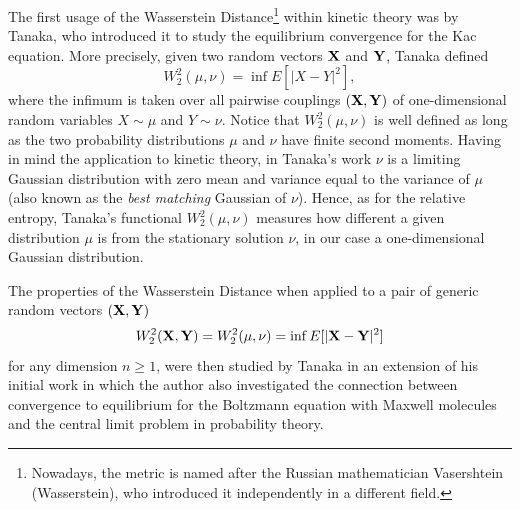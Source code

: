 \documentclass{article}
\renewcommand{\ge}{\geqslant}
\def\bX{{\bf X}}
\def\bY{{\bf Y}}
\begin{document}
% 
The first usage of the Wasserstein Distance\footnote{Nowadays, the metric is named after the Russian mathematician Vasershtein (Wasserstein), who introduced it independently in a different field.\cite{Wass}} within kinetic theory was by Tanaka, who introduced it to study the equilibrium convergence for the Kac equation.\cite{Tan1}
% 
More precisely, given two random vectors $\bX$ and $\bY$, Tanaka defined 
\[
    W^2_2(\mu,\nu) = \inf E[|X-Y|^2],
\]
where the infimum is taken over all pairwise couplings $(\bX,\bY)$ of one-dimensional random variables $X\sim \mu$ and $Y\sim\nu$.
% 
Notice that $W^2_2(\mu,\nu)$ is well defined as long as the two probability distributions $\mu$ and $\nu$ have finite second moments.
% 
Having in mind the application to kinetic theory, in Tanaka's work $\nu$ is a limiting Gaussian distribution with zero mean and variance equal to the variance of $\mu$ (also known as the \emph{best matching} Gaussian of $\nu$).
% 
Hence, as for the relative entropy, Tanaka's functional  $W^2_2(\mu,\nu)$ measures how different a given distribution $\mu$ is from the stationary solution $\nu$, in our case a one-dimensional Gaussian distribution.
% 


The properties of the Wasserstein Distance when applied to a pair of generic random vectors $(\bX,\bY)$
% 
\begin{equation}
    \label{Wasser}
    W^2_2(\bX,\bY) = W^2_2(\mu,\nu) = \inf E[|\bX-\bY|^2]
\end{equation}
% 
for any dimension $n\ge 1$, were then studied by Tanaka in an extension of his initial work\cite{Tan2} in which the author also investigated the connection between convergence to equilibrium for the Boltzmann equation with Maxwell molecules and the central limit problem in probability theory.\cite{RR}
% 
\end{document}
